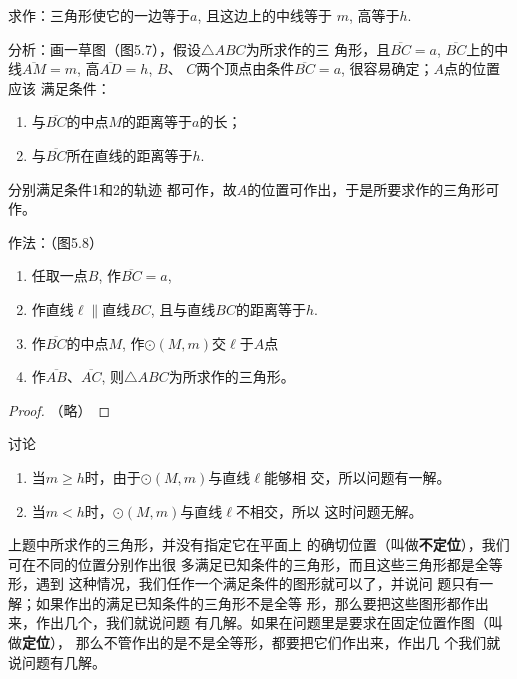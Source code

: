 求作：三角形使它的一边等于$a$, 且这边上的中线等于
$m$, 高等于$h$.

分析：画一草图（图5.7），假设$\triangle ABC$为所求作的三
角形，且$\overline{BC}=a$, $\overline{BC}$上的中线$\overline{AM}=m$, 高$\overline{AD}=h$, $B$、
$C$两个顶点由条件$\overline{BC}=a$, 很容易确定；$A$点的位置应该
满足条件：
\begin{enumerate}
    \item 与$\overline{BC}$的中点$M$的距离等于$a$的长；
    \item 与$\overline{BC}$所在直线的距离等于$h$.
\end{enumerate}
分别满足条件1和2的轨迹
都可作，故$A$的位置可作出，于是所要求作的三角形可作。

作法：（图5.8）
\begin{figure}[htp]
    \centering
{}
    \caption{}
\end{figure}

\begin{enumerate}
    \item 任取一点$B$, 作$\overline{BC}=a$,
    \item 作直线$\ell\parallel$直线$BC$,
    且与直线$BC$的距离等于$h$.
    \item 作$\overline{BC}$的中点$M$, 作$\odot(M,m)$交$\ell$于$A$点
    \item  作$\overline{AB}$、$\overline{AC}$, 则$\triangle
    ABC$为所求作的三角形。
\end{enumerate}

\begin{proof}
    （略）
\end{proof}

讨论
\begin{enumerate}
    \item 当$m\ge h$时，由于$\odot(M,m)$与直线$\ell$能够相
交，所以问题有一解。
\item 当$m<h$时，$\odot(M,m)$与直线$\ell$不相交，所以
这时问题无解。
\end{enumerate}

\begin{rmk}
    上题中所求作的三角形，并没有指定它在平面上
    的确切位置（叫做\textbf{不定位}），我们可在不同的位置分别作出很
    多满足已知条件的三角形，而且这些三角形都是全等形，遇到
    这种情况，我们任作一个满足条件的图形就可以了，并说问
    题只有一解；如果作出的满足已知条件的三角形不是全等
    形，那么要把这些图形都作出来，作出几个，我们就说问题
    有几解。如果在问题里是要求在固定位置作图（叫做\textbf{定位}），
    那么不管作出的是不是全等形，都要把它们作出来，作出几
    个我们就说问题有几解。 
\end{rmk}


